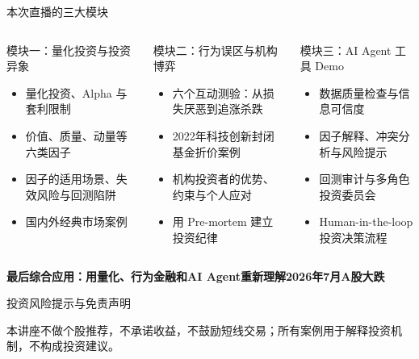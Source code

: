 \documentclass[UTF8,aspectratio=169,11pt]{ctexbeamer}
\begin{document}
\begin{frame}{本次直播的三大模块}
\begin{columns}[T,totalwidth=\textwidth]
\begin{keybox}{模块一：量化投资与投资异象}
\small
\begin{itemize}
\item 量化投资、Alpha 与套利限制
\item 价值、质量、动量等六类因子
\item 因子的适用场景、失效风险与回测陷阱
\item 国内外经典市场案例
\end{itemize}
\end{keybox}
\begin{casebox}{模块二：行为误区与机构博弈}
\small
\begin{itemize}
\item 六个互动测验：从损失厌恶到追涨杀跌
\item 2022年科技创新封闭基金折价案例
\item 机构投资者的优势、约束与个人应对
\item 用 Pre-mortem 建立投资纪律
\end{itemize}
\end{casebox}
\begin{greenbox}{模块三：AI Agent 工具 Demo}
\small
\begin{itemize}
\item 数据质量检查与信息可信度
\item 因子解释、冲突分析与风险提示
\item 回测审计与多角色投资委员会
\item Human-in-the-loop 投资决策流程
\end{itemize}
\end{greenbox}
\end{columns}
\vspace{0.18cm}
\begin{center}
\small
\textbf{最后综合应用：用量化、行为金融和AI Agent重新理解2026年7月A股大跌}
\end{center}
\end{frame}

\begin{frame}{投资风险提示与免责声明}
\begin{riskbox}{}
本讲座不做个股推荐，不承诺收益，不鼓励短线交易；所有案例用于解释投资机制，不构成投资建议。
\end{riskbox}
\end{frame}
\end{document}
